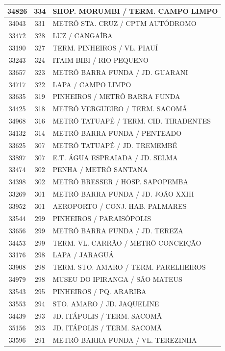 \documentclass[
	12pt,				%
	oneside,			%
	a4paper,			%
	english,			%
	brazil				%
	]{abntex2ppgsi}
\begin{document}
{{\begin{apendicesenv}
\begin{longtable}{c|c|p{7cm}}
 \hline 
34826 &	334 &	SHOP. MORUMBI / TERM. CAMPO LIMPO \\ 
 \hline 
34043 &	331 &	METRÔ STA. CRUZ / CPTM AUTÓDROMO \\ 
 \hline 
33472 &	328 &	LUZ / CANGAÍBA \\ 
 \hline 
33190 &	327 &	TERM. PINHEIROS / VL. PIAUÍ \\ 
 \hline 
33243 &	324 &	ITAIM BIBI / RIO PEQUENO \\ 
 \hline 
33657 &	323 &	METRÔ BARRA FUNDA / JD. GUARANI \\ 
 \hline 
34717 &	322 &	LAPA / CAMPO LIMPO \\ 
 \hline 
33635 &	319 &	PINHEIROS / METRÔ BARRA FUNDA \\ 
 \hline 
34425 &	318 &	METRÔ VERGUEIRO / TERM. SACOMÃ \\ 
 \hline 
34968 &	316 &	METRÔ TATUAPÉ / TERM. CID. TIRADENTES \\ 
 \hline 
34132 &	314 &	METRÔ BARRA FUNDA / PENTEADO \\ 
 \hline 
33625 &	307 &	METRÔ TATUAPÉ / JD. TREMEMBÉ \\ 
 \hline 
33897 &	307 &	E.T. ÁGUA ESPRAIADA / JD. SELMA \\ 
 \hline 
33474 &	302 &	PENHA / METRÔ SANTANA \\ 
 \hline 
34398 &	302 &	METRÔ BRESSER / HOSP. SAPOPEMBA \\ 
 \hline 
33269 &	301 &	METRÔ BARRA FUNDA / JD. JOÃO XXIII \\ 
 \hline 
33952 &	301 &	AEROPORTO / CONJ. HAB. PALMARES \\ 
 \hline 
33544 &	299 &	PINHEIROS / PARAISÓPOLIS \\ 
 \hline 
33656 &	299 &	METRÔ BARRA FUNDA / JD. TEREZA \\ 
 \hline 
34453 &	299 &	TERM. VL. CARRÃO / METRÔ CONCEIÇÃO \\ 
 \hline 
33176 &	298 &	LAPA / JARAGUÁ \\ 
 \hline 
33908 &	298 &	TERM. STO. AMARO / TERM. PARELHEIROS \\ 
 \hline 
34979 &	298 &	MUSEU DO IPIRANGA / SÃO MATEUS \\ 
 \hline 
33543 &	295 &	PINHEIROS / PQ. ARARIBA \\ 
 \hline 
33553 &	294 &	STO. AMARO / JD. JAQUELINE \\ 
 \hline 
34439 &	293 &	JD. ITÁPOLIS / TERM. SACOMÃ \\ 
 \hline 
35156 &	293 &	JD. ITÁPOLIS / TERM. SACOMÃ \\ 
 \hline 
33596 &	291 &	METRÔ BARRA FUNDA / VL. TEREZINHA \\ 

\end{longtable}
\end{apendicesenv}}}
\end{document}
